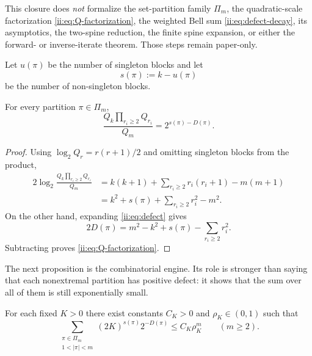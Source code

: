 This closure does \emph{not} formalize the set-partition family \(\Pi_m\),
the quadratic-scale factorization \eqref{ii:eq:Q-factorization}, the weighted
Bell sum \eqref{ii:eq:defect-decay}, its asymptotics, the two-spine reduction,
the finite spine expansion, or either the forward- or inverse-iterate theorem.
Those steps remain paper-only.
\endgroup

Let $u(\pi)$ be the number of singleton blocks and let
\begin{equation}
 s(\pi):=k-u(\pi)
 \label{ii:eq:s-nonsingleton}
\end{equation}
be the number of non-singleton blocks.

\begin{lemma}
\label{ii:lem:Q-factorization}
For every partition $\pi\in\Pi_m$,
\begin{equation}
 \frac{Q_k\prod_{r_i\geq2}Q_{r_i}}{Q_m}
 =2^{s(\pi)-D(\pi)}.
 \label{ii:eq:Q-factorization}
\end{equation}
\end{lemma}

\begin{proof}
Using $\log_2Q_r=r(r+1)/2$ and omitting singleton blocks from the product,
\begin{align*}
 2\log_2\frac{Q_k\prod_{r_i\ge2}Q_{r_i}}{Q_m}
 &=k(k+1)+\sum_{r_i\ge2}r_i(r_i+1)-m(m+1)\\
 &=k^2+s(\pi)+\sum_{r_i\ge2}r_i^2-m^2.
\end{align*}
On the other hand, expanding \eqref{ii:eq:defect} gives
\[
 2D(\pi)=m^2-k^2+s(\pi)-\sum_{r_i\ge2}r_i^2.
\]
Subtracting proves \eqref{ii:eq:Q-factorization}.
\end{proof}

The next proposition is the combinatorial engine.  Its role is stronger than saying
that each nonextremal partition has positive defect: it shows that the sum over all
of them is still exponentially small.

\begin{proposition}
\label{ii:prop:defect-decay}
For each fixed $K>0$ there exist constants $C_K>0$ and $\rho_K\in(0,1)$ such that
\begin{equation}
 \sum_{\substack{\pi\in\Pi_m\\1<|\pi|<m}}
   (2K)^{s(\pi)}2^{-D(\pi)}
 \leq C_K\rho_K^m
 \qquad(m\geq2).
 \label{ii:eq:defect-decay}
\end{equation}
\end{proposition}

